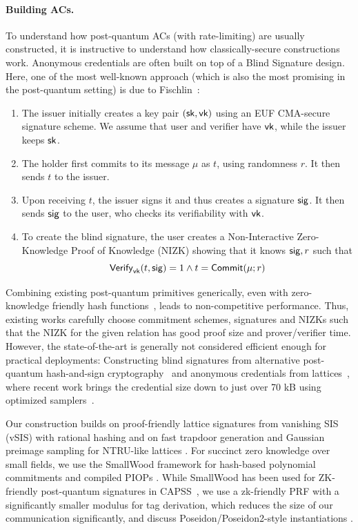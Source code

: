 \paragraph*{Building ACs.}
To understand how post-quantum ACs (with rate-limiting) are usually  constructed, it is instructive to understand how  classically-secure constructions work. 
Anonymous credentials are often built on top of a Blind Signature design. Here, one of the most well-known approach (which is also the most promising in the post-quantum setting) is due to Fischlin~\cite{C:Fischlin06}:
\begin{enumerate}
	\item The issuer initially creates a key pair $(\mathsf{sk},\mathsf{vk})$ using an EUF CMA-secure signature scheme. We assume that user and verifier have $\mathsf{vk}$, while the issuer keeps $\mathsf{sk}$.
	\item The holder first commits to its message $\mu$ as \(t\), using randomness $r$. It then sends $t$ to the issuer.
	\item Upon receiving $t$, the issuer signs it and thus  creates a signature $\mathsf{sig}$. It then sends $\mathsf{sig}$ to the user, who checks its verifiability with $\mathsf{vk}$.
	\item To create the blind signature, the user creates a Non-Interactive Zero-Knowledge Proof of Knowledge (NIZK) showing that it knows $\mathsf{sig},r$ such that $$\mathsf{Verify}_{\mathsf{vk}}(t,\mathsf{sig})=1 \land t= \mathsf{Commit}(\mu;r)$$
\end{enumerate}
Combining existing post-quantum primitives generically, even with zero-knowledge friendly hash functions~\cite{EPRINT:PWFW23}, leads to non-competitive performance. Thus, existing works  carefully choose commitment schemes, signatures and NIZKs such that the NIZK for the given relation has good proof size and prover/verifier time. However, the state-of-the-art is generally not considered efficient enough for practical deployments:
Constructing blind signatures from alternative post-quantum hash-and-sign
cryptography~\cite{EPRINT:BFMRSV25a} and anonymous credentials from
lattices~\cite{EPRINT:LCLLW23}, where recent work brings the credential size
down to just over 70 kB using optimized samplers~\cite{C:JeuRouSan23,AC:JeuSan25}. 

Our construction builds on proof-friendly lattice signatures from vanishing SIS (vSIS) with rational hashing
\cite{EPRINT:DKLW25,PKC:DKLW25} and on fast trapdoor generation and Gaussian preimage sampling for NTRU-like
lattices \cite{EPRINT:ENSTW23}. For succinct zero knowledge over small fields, we use the SmallWood framework
for hash-based polynomial commitments and compiled PIOPs \cite{EPRINT:FenRiv25b}. 
While SmallWood has been used for ZK-friendly post-quantum signatures in CAPSS~\cite{EPRINT:FenRiv25a}, we use a zk-friendly PRF with a significantly smaller modulus for tag derivation, which reduces the size of our communication significantly, and discuss Poseidon/Poseidon2-style instantiations \cite{USENIX:GKRRS21,AFRICACRYPT:GraKhoSch23}.



